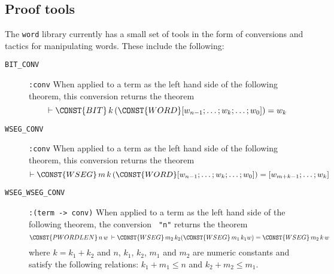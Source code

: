 \subsection{Proof tools}

The {\tt word} library currently has a small set of tools in the form
of conversions and tactics for manipulating words. These include the
following:
\begin{description}
\item[{\tt BIT\_CONV}] \verb|:conv| When applied to a term as the
left hand side of the following theorem, this conversion returns the theorem
\[
\THM \CONST{BIT}\,k\,(\CONST{WORD}[w_{n-1};\ldots;w_{k};\ldots;w_0]) = w_k
\]

\item[{\tt WSEG\_CONV}] \verb|:conv| When applied to a term as the
left hand side of the following theorem, this conversion returns the theorem
\[
\THM \CONST{WSEG}\,m\,k\,(\CONST{WORD}[w_{n-1};\ldots;w_{k};\ldots;w_0])
= [w_{m+k-1};\ldots; w_k]
\]

\item[{\tt WSEG\_WSEG\_CONV}] \verb|:(term -> conv)| When applied to a
term as the left hand side of the following theorem, the conversion
{\tt {} "n"} returns the theorem
\[
\CONST{PWORDLEN}\,n\,w\:\THM
\CONST{WSEG}\,m_2\,k_2(\CONST{WSEG}\,m_1\,k_1 w) = \CONST{WSEG}\,m_2\,k\,w
\]
where $k = k_1 + k_2$ and $n$, $k_1$, $k_2$, $m_1$ and $m_2$ are
numeric constants and satisfy the following relations: $k_1 + m_1\leq
n$ and $k_2 + m_2 \leq m_1$.


\end{description}
